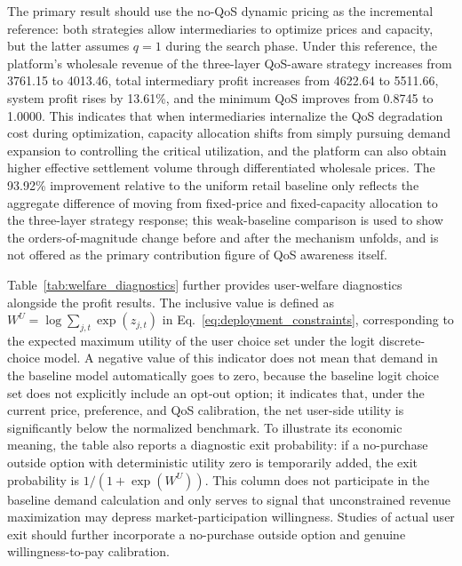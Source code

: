 \documentclass[11pt,a4paper]{article}
\begin{document}
The primary result should use the no-QoS dynamic pricing as the incremental reference: both strategies allow intermediaries to optimize prices and capacity, but the latter assumes $q=1$ during the search phase. Under this reference, the platform's wholesale revenue of the three-layer QoS-aware strategy increases from 3761.15 to 4013.46, total intermediary profit increases from 4622.64 to 5511.66, system profit rises by 13.61\%, and the minimum QoS improves from 0.8745 to 1.0000. This indicates that when intermediaries internalize the QoS degradation cost during optimization, capacity allocation shifts from simply pursuing demand expansion to controlling the critical utilization, and the platform can also obtain higher effective settlement volume through differentiated wholesale prices. The 93.92\% improvement relative to the uniform retail baseline only reflects the aggregate difference of moving from fixed-price and fixed-capacity allocation to the three-layer strategy response; this weak-baseline comparison is used to show the orders-of-magnitude change before and after the mechanism unfolds, and is not offered as the primary contribution figure of QoS awareness itself.

Table~\ref{tab:welfare_diagnostics} further provides user-welfare diagnostics alongside the profit results. The inclusive value is defined as $W^U=\log\sum_{j,t}\exp(z_{j,t})$ in Eq.~\eqref{eq:deployment_constraints}, corresponding to the expected maximum utility of the user choice set under the logit discrete-choice model. A negative value of this indicator does not mean that demand in the baseline model automatically goes to zero, because the baseline logit choice set does not explicitly include an opt-out option; it indicates that, under the current price, preference, and QoS calibration, the net user-side utility is significantly below the normalized benchmark. To illustrate its economic meaning, the table also reports a diagnostic exit probability: if a no-purchase outside option with deterministic utility zero is temporarily added, the exit probability is $1/(1+\exp(W^U))$. This column does not participate in the baseline demand calculation and only serves to signal that unconstrained revenue maximization may depress market-participation willingness. Studies of actual user exit should further incorporate a no-purchase outside option and genuine willingness-to-pay calibration.
\end{document}
